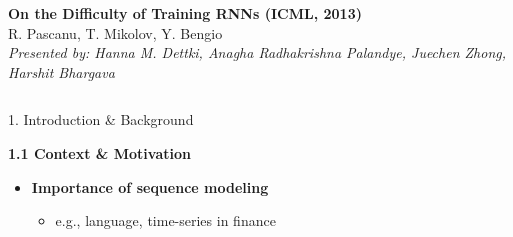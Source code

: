 \begin{frame}[t]
\begin{center}

    {\Huge\bfseries On the Difficulty of Training RNNs (ICML, 2013)}\\[0.5em]
    {\Large R. Pascanu, T. Mikolov, Y. Bengio}\\[1em]
    {\large \textit{Presented by: Hanna M. Dettki, Anagha Radhakrishna Palandye, Juechen Zhong, Harshit Bhargava}}
  \end{center}
  

  \begin{columns}[t,totalwidth=\textwidth]

    \begin{column}{0.3\textwidth}
        \hspace{2em}
      \begin{block}{1. Introduction \& Background}

        \textbf{1.1 Context \& Motivation}
            \begin{itemize}
            \item \textbf{Importance of sequence modeling}
            \begin{itemize}
                \item e.g., language, time-series in finance
            \end{itemize}


\end{itemize}
\end{block}
\end{column}
\end{columns}
\end{frame}
